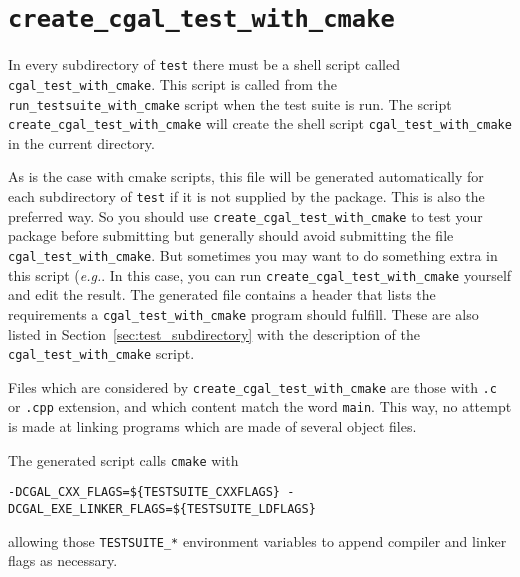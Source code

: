 \section{{\tt create\_cgal\_test\_with\_cmake}}
\label{sec:create_cgal_test_with_cmake}

In every subdirectory of {\tt test} there must be a shell script called
{\tt cgal\_test\_with\_cmake}. This script is called from the {\tt run\_testsuite\_with\_cmake}%
script when the test suite is run. The script
{{\tt create\_cgal\_test\_with\_cmake}}
will create the shell script {\tt cgal\_test\_with\_cmake} in the current directory.

As is the case with cmake scripts, this file will be generated automatically 
for each subdirectory of {\tt test} if
it is not supplied by the package. This is also the preferred way.
So you should use {\tt create\_cgal\_test\_with\_cmake} to test your package before
submitting but generally should avoid submitting the file {\tt cgal\_test\_with\_cmake}.
But sometimes you may want to do something extra in this script ({\em e.g.}.
In this case, you can run {\tt create\_cgal\_test\_with\_cmake} yourself and edit the result.
The generated file contains a header that lists the requirements a
{\tt cgal\_test\_with\_cmake} program should fulfill. These are also listed in
Section~\ref{sec:test_subdirectory} with the description of the
{\tt cgal\_test\_with\_cmake} script.

Files which are considered by {{\tt create\_cgal\_test\_with\_cmake}} are those with
{\tt .c} or {\tt .cpp} extension, and which content match the word {\tt main}.
This way, no attempt is made at linking programs which are made of several
object files.

The generated script calls {\tt cmake} with
\begin{verbatim}
-DCGAL_CXX_FLAGS=${TESTSUITE_CXXFLAGS} -DCGAL_EXE_LINKER_FLAGS=${TESTSUITE_LDFLAGS}
\end{verbatim}

allowing those {\tt TESTSUITE\_*} environment variables to append compiler and linker
flags as necessary.


